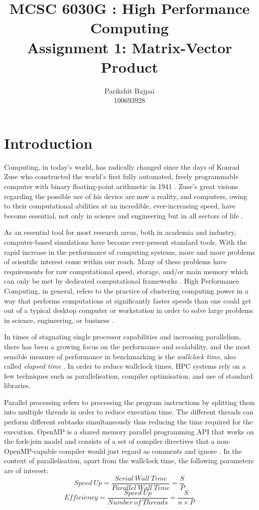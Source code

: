 \documentclass[11pt, oneside]{article}   	%
\title{MCSC 6030G : High Performance Computing \\ Assignment 1: Matrix-Vector Product}
\author{Parikshit Bajpai \\ 100693928}
\date{}							%
\begin{document}
\maketitle

\section{Introduction}
Computing, in today's world, has radically changed since the days of Konrad Zuse who constructed the world's first fully automated, freely   programmable computer with binary floating-point arithmetic in 1941 \cite{Rojas:2002aa}.  Zuse's  great visions regarding the possible use of his device are now a reality, and computers, owing to their computational abilities at an incredible, ever-increasing speed, have become essential, not only in science and engineering but in all sectors of life \cite{Zuse:1993aa}.

As an essential tool for most research areas, both in academia and industry, computer-based simulations have become ever-present standard tools. With the rapid increase in the performance of computing systems, more and more problems of scientific interest come within our reach. Many of these problems have requirements for raw computational speed, storage, and/or main memory which can only be met by dedicated computational frameworks \cite{Hager:2010aa}. High Performance Computing, in general, refers to the practice of clustering computing power in a way that performs computations at significantly faster speeds than one could get out of a typical desktop computer or workstation in order to solve large problems in science, engineering, or business \cite{insidehpc:aa}.

In times of stagnating single processor capabilities and increasing parallelism, there has been a growing focus on the performance and scalability, and the most sensible measure of performance in benchmarking is the \textit{wallclock time}, also called \textit{elapsed time} \cite{Hager:2010aa}. In order to reduce wallclock times, HPC systems rely on a few techniques such as parallelisation, compiler optimisation, and use of standard libraries.

Parallel processing refers to processing the program instructions by splitting them into multiple threads in order to reduce execution time. The different threads can perform different subtasks simultaneously thus reducing the time required for the execution. OpenMP is a shared memory parallel programming API that works on the fork-join model and consists of a set of compiler directives that a non-OpenMP-capable compiler would just regard as comments and ignore \cite{Board:2015aa}. In the context of parallelisation, apart from the wallclock time, the following parameters are of interest:
\begin{equation} \label{Speedup}
Speed \: Up = \frac{Serial \: Wall \: Time}{Parallel \: Wall \: Time} = \frac{S}{P}
\end{equation}
\begin{equation} \label{Efficiency}
Efficiency = \frac{Speed  \: Up}{Number \: of  \: Threads} = \frac{S}{n \times P}
\end{equation}
\end{document}
